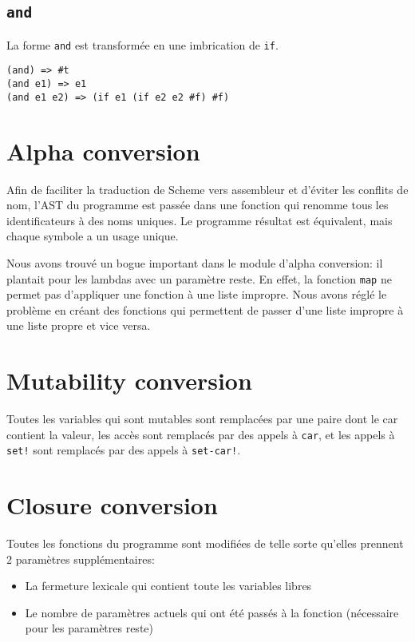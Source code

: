 \documentclass[10pt]{report}
\begin{document}
\subsection{\tt and}

La forme {\tt and} est transformée en une imbrication de {\tt if}.


\begin{verbatim}
(and) => #t
(and e1) => e1
(and e1 e2) => (if e1 (if e2 e2 #f) #f)
\end{verbatim}


\section{Alpha conversion}

Afin de faciliter la traduction de Scheme vers assembleur et d'éviter
les conflits de nom, l'AST du programme est passée dans une fonction
qui renomme tous les identificateurs à des noms uniques.  Le programme
résultat est équivalent, mais chaque symbole a un usage unique.

Nous avons trouvé un bogue important dans le module d'alpha
conversion: il plantait pour les lambdas avec un paramètre reste.  En
effet, la fonction {\tt map} ne permet pas d'appliquer une fonction à
une liste impropre.  Nous avons réglé le problème en créant des
fonctions qui permettent de passer d'une liste impropre à une liste
propre et vice versa.

\section{Mutability conversion}

Toutes les variables qui sont mutables sont remplacées par une paire
dont le car contient la valeur, les accès sont remplacés par des
appels à {\tt car}, et les appels à {\tt set!} sont remplacés par des
appels à {\tt set-car!}.

\section{Closure conversion}

Toutes les fonctions du programme sont modifiées de telle sorte
qu'elles prennent 2 paramètres supplémentaires:

\begin{itemize}
\item La fermeture lexicale qui contient toute les variables libres
\item Le nombre de paramètres actuels qui ont été passés à la fonction
  (nécessaire pour les paramètres reste)
\end{itemize}
\end{document}

